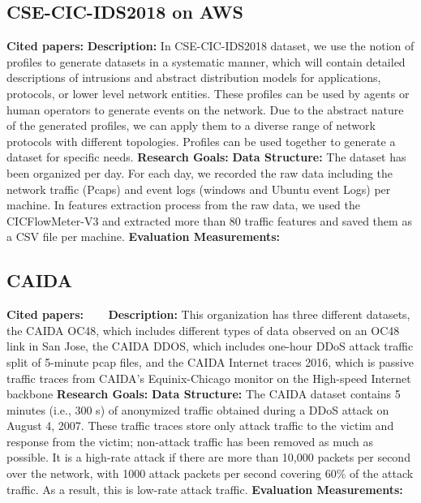 \subsection{CSE-CIC-IDS2018 on AWS}
\textbf{Cited papers:} \newline
\textbf{Description:} In CSE-CIC-IDS2018 dataset, we use the notion of profiles to generate datasets in a systematic manner, which will contain detailed descriptions of intrusions and abstract distribution models for applications, protocols, or lower level network entities. These profiles can be used by agents or human operators to generate events on the network. Due to the abstract nature of the generated profiles, we can apply them to a diverse range of network protocols with different topologies. Profiles can be used together to generate a dataset for specific needs.\newline
\textbf{Research Goals:}  \newline
\textbf{Data Structure:} The dataset has been organized per day. For each day, we recorded the raw data including the network traffic (Pcaps) and event logs (windows and Ubuntu event Logs) per machine. In features extraction process from the raw data, we used the CICFlowMeter-V3 and extracted more than 80 traffic features and saved them as a CSV file per machine. \newline
\textbf{Evaluation Measurements:} \newline



\subsection{CAIDA}
\textbf{Cited papers:}~\cite{shiravi2012toward}~\cite{bhuyan2015empirical} ~\cite{moore2006inferring} \newline
\textbf{Description:} This organization has three different datasets, the CAIDA OC48, which includes different types of data observed on an OC48 link in San Jose, the CAIDA DDOS, which includes one-hour DDoS attack traffic split of 5-minute pcap files, and the CAIDA Internet traces 2016, which is passive traffic traces from CAIDA’s Equinix-Chicago monitor on
the High-speed Internet backbone\newline
\textbf{Research Goals:}  \newline
\textbf{Data Structure:} The CAIDA dataset contains 5 minutes (i.e., 300 s) of anonymized traffic obtained during a DDoS attack on August 4, 2007. These traffic traces store only attack traffic to the victim and response from the victim; non-attack traffic has been removed as much as possible. It is a high-rate attack if there are more than 10,000 packets per second over the network, with 1000 attack packets per second covering 60\% of the attack traffic. As a result, this
is low-rate attack traffic.\newline
\textbf{Evaluation Measurements:} \newline


